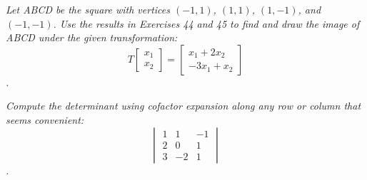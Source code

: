 \documentclass[12pt,letterpaper]{hmcpset}
\begin{document}
\newpage


\begin{problem}[3.6.50]
    \textit{Let ABCD be the square with vertices $(-1, 1)$, $(1, 1)$, $(1, -1)$, and $(-1, -1)$. Use the results in Exercises 44 and 45 to find and draw the image of ABCD under the given transformation:
    \[T\begin{bmatrix}
    x_1 \\ x_2
    \end{bmatrix}=
    \begin{bmatrix}
    x_1 + 2x_2 \\ -3x_1 + x_2
    \end{bmatrix}
    \].}
\end{problem}

\begin{solution}
    \vfill
\end{solution}

\newpage


\begin{problem}[4.2.8]
    \textit{Compute the determinant using cofactor expansion along any row or column that seems convenient:
    \[\begin{vmatrix}
    1 &  1 & -1 \\
    2 &  0 &  1 \\
    3 & -2 &  1 
    \end{vmatrix}\].}
\end{problem}

\begin{solution}
    \vfill
\end{solution}

\newpage
\end{document}
